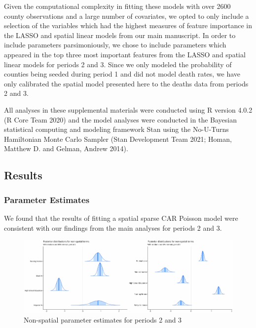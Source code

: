 \documentclass[
]{article}
\begin{document}
Given the computational complexity in fitting these models with over
2600 county observations and a large number of covariates, we opted to
only include a selection of the variables which had the highest measures
of feature importance in the LASSO and spatial linear models from our
main manuscript. In order to include parameters parsimoniously, we chose
to include parameters which appeared in the top three most important
features from the LASSO and spatial linear models for periods 2 and 3.
Since we only modeled the probability of counties being seeded during
period 1 and did not model death rates, we have only calibrated the
spatial model presented here to the deaths data from periods 2 and 3.

All analyses in these supplemental materials were conducted using R
version 4.0.2 (R Core Team 2020) and the model analyses were conducted
in the Bayesian statistical computing and modeling framework Stan using
the No-U-Turns Hamiltonian Monte Carlo Sampler (Stan Development Team
2021; Homan, Matthew D. and Gelman, Andrew 2014).

\newpage

\hypertarget{results}{%
\subsection{Results}\label{results}}

\hypertarget{parameter-estimates}{%
\subsubsection{Parameter Estimates}\label{parameter-estimates}}

We found that the results of fitting a spatial sparse CAR Poisson model
were consistent with our findings from the main analyses for periods 2
and 3.

\begin{figure}

{\centering \includegraphics[width=1\linewidth,height=0.4\textheight]{supplement_files/figure-latex/unnamed-chunk-1-1} 

}

\caption{Non-spatial parameter estimates for periods 2 and 3}\label{fig:unnamed-chunk-1}
\end{figure}
\end{document}
